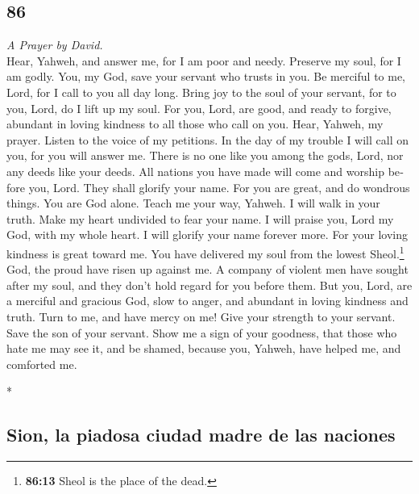 \begin{paracol}{2}
\switchcolumn
\begin{otherlanguage}{english}

\hypertarget{section-171}{%
\section{86}\label{section-171}}

\emph{A Prayer by David.}\\
 Hear, Yahweh, and answer me, for I am poor and needy.
 Preserve my soul, for I am godly. You, my God, save your
servant who trusts in you.  Be merciful to me, Lord, for I
call to you all day long.  Bring joy to the soul of your
servant, for to you, Lord, do I lift up my soul.  For you,
Lord, are good, and ready to forgive, abundant in loving kindness to all
those who call on you.  Hear, Yahweh, my prayer. Listen to
the voice of my petitions.  In the day of my trouble I
will call on you, for you will answer me.  There is no one
like you among the gods, Lord, nor any deeds like your deeds.
 All nations you have made will come and worship before
you, Lord. They shall glorify your name.  For you are
great, and do wondrous things. You are God alone.  Teach
me your way, Yahweh. I will walk in your truth. Make my heart undivided
to fear your name.  I will praise you, Lord my God, with
my whole heart. I will glorify your name forever more. 
For your loving kindness is great toward me. You have delivered my soul
from the lowest Sheol.\footnote{\textbf{86:13} Sheol is the place of the
  dead.}  God, the proud have risen up against me. A
company of violent men have sought after my soul, and they don't hold
regard for you before them.  But you, Lord, are a
merciful and gracious God, slow to anger, and abundant in loving
kindness and truth.  Turn to me, and have mercy on me!
Give your strength to your servant. Save the son of your servant.
 Show me a sign of your goodness, that those who hate me
may see it, and be shamed, because you, Yahweh, have helped me, and
comforted me.

\end{otherlanguage}

\switchcolumn[0]*

\hypertarget{sion-la-piadosa-ciudad-madre-de-las-naciones}{%
\subsection{Sion, la piadosa ciudad madre de las
naciones}\label{sion-la-piadosa-ciudad-madre-de-las-naciones}}


\end{paracol}
